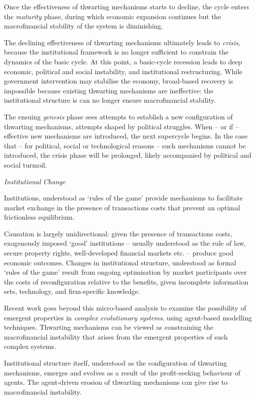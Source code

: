 \documentclass[
]{book}
\begin{document}
Once the effectiveness of thwarting mechanisms starts to decline, the cycle enters
the \emph{maturity} phase, during which economic expansion continues but
the macrofinancial stability of the system is diminishing.

The declining effectiveness of thwarting mechanisms ultimately leads to \emph{crisis},
because the institutional framework is no longer sufficient to
constrain the dynamics of the basic cycle.
At this point, a basic-cycle recession leads to deep economic, political and social instability,
and institutional restructuring.
While government intervention may stabilise the economy, broad-based recovery is impossible because
existing thwarting mechanisms are ineffective: the institutional structure is can no longer ensure
macrofinancial stability.

The ensuing \emph{genesis} phase sees attempts to establish a new configuration of
thwarting mechanisms, attempts shaped by political struggles.
When -- or if -- effective new mechanisms are introduced, the next supercycle begins.
In the case that -- for political, social or technological reasons --
such mechanisms cannot be introduced, the crisis phase will be prolonged,
likely accompanied by political and social turmoil.

\emph{Institutional Change}

Institutions, understood as `rules of the game' provide mechanisms to facilitate
market exchange in the presence of transactions costs that
prevent an optimal frictionless equilibrium.

Causation is largely unidirectional: given the presence of transactions costs,
exogenously imposed `good' institutions --
usually understood as the rule of law, secure property rights, well-developed
financial markets etc. -- produce good economic outcomes.
Changes in institutional structure, understood as formal `rules of the game'
result from ongoing optimisation by market participants
over the costs of reconfiguration relative to the benefits,
given incomplete information sets, technology, and firm-specific knowledge.

Recent work goes beyond this micro-based analysis to examine the possibility of emergent properties
in \emph{complex evolutionary systems}, using agent-based modelling techniques.
Thwarting mechanisms can be viewed as constraining the macrofinancial instability that arises
from the emergent properties of such complex systems.

Institutional structure itself, understood as the configuration of thwarting mechanisms,
emerges and evolves as a result of the profit-seeking behaviour of agents.
The agent-driven erosion of thwarting mechanisms can give rise to
macrofinancial instability.
\end{document}
